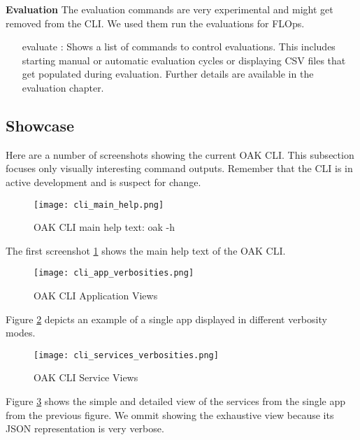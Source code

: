\vspace{5mm}
\textbf{Evaluation}\newline
The evaluation commands are very experimental and might get removed from the CLI.
We used them run the evaluations for FLOps.

\begin{itemize}
    \item [evaluate]:
        Shows a list of commands to control evaluations.
        This includes starting manual or automatic evaluation cycles or displaying CSV files that get populated during evaluation.
        Further details are available in the evaluation chapter.
\end{itemize}

\subsection{Showcase}

Here are a number of screenshots showing the current OAK CLI.
This subsection focuses only visually interesting command outputs. 
Remember that the CLI is in active development and is suspect for change.

\begin{figure}[h]
    \begin{adjustwidth}{-0.1\paperwidth}{-0.1\paperwidth}
        \centering
        \texttt{[image: cli\_main\_help.png]}
        \caption{OAK CLI main help text: oak -h}
        \label{fig:cli_main_help}
    \end{adjustwidth}
\end{figure}
The first screenshot \ref{fig:cli_main_help} shows the main help text of the OAK CLI.

\begin{figure}[h]
    \begin{adjustwidth}{-0.2\paperwidth}{-0.2\paperwidth}
        \centering
        \texttt{[image: cli\_app\_verbosities.png]}
        \caption{OAK CLI Application Views}
        \label{fig:cli_app_views}
    \end{adjustwidth}
\end{figure}
Figure \ref{fig:cli_app_views} depicts an example of a single app displayed in different verbosity modes.

\begin{figure}[h]
        \centering
        \texttt{[image: cli\_services\_verbosities.png]}
        \caption{OAK CLI Service Views}
        \label{fig:cli_service_views}
\end{figure}
Figure \ref{fig:cli_service_views} shows the simple and detailed view of the services from the single app from the previous figure.
We ommit showing the exhaustive view because its JSON representation is very verbose.

